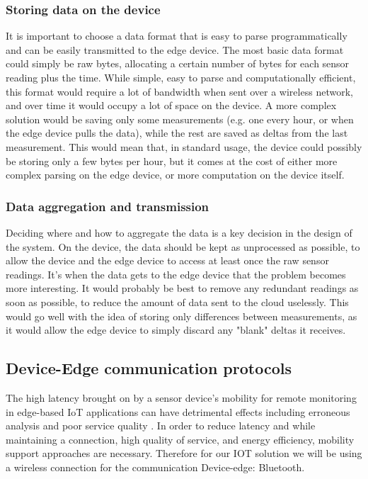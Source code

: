 \subsubsection*{Storing data on the device}
It is important to choose a data format that is easy to parse programmatically and
can be easily transmitted to the edge device. The most basic data format could simply
be raw bytes, allocating a certain number of bytes for each sensor reading plus the
time. While simple, easy to parse and computationally efficient, this format would
require a lot of bandwidth when sent over a wireless network, and over time it would
occupy a lot of space on the device. A more complex solution would be saving only some
measurements (e.g. one every hour, or when the edge device pulls the data), while
the rest are saved as deltas from the last measurement. This would mean that, in
standard usage, the device could possibly be storing only a few bytes per hour, but
it comes at the cost of either more complex parsing on the edge device, or more
computation on the device itself.
\subsubsection*{Data aggregation and transmission}
Deciding where and how to aggregate the data is a key decision in the design of the
system. On the device, the data should be kept as unprocessed as possible, to allow the device
and the edge device to access at least once the raw sensor readings. It's when the data
gets to the edge device that the problem becomes more interesting. It would probably
be best to remove any redundant readings as soon as possible, to reduce the amount of
data sent to the cloud uselessly. This would go well with the idea of storing only
differences between measurements, as it would allow the edge device to simply discard
any "blank" deltas it receives.

\subsection{Device-Edge communication protocols}
The high latency brought on by a sensor device's mobility for remote monitoring in edge-based IoT applications can have detrimental effects including erroneous analysis and poor service quality \cite{b5}. In order to reduce latency and while maintaining a connection, high quality of service, and energy efficiency, mobility support approaches are necessary. Therefore for our IOT solution we will be using a wireless connection for the communication Device-edge: Bluetooth. 
